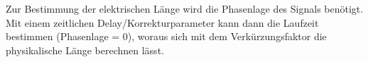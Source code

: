 Zur Bestimmung der elektrischen Länge wird die Phasenlage des Signals benötigt.
Mit einem zeitlichen Delay/Korrekturparameter kann dann die Laufzeit bestimmen
(Phasenlage = 0), woraus sich mit dem Verkürzungsfaktor die physikalische Länge berechnen lässt.